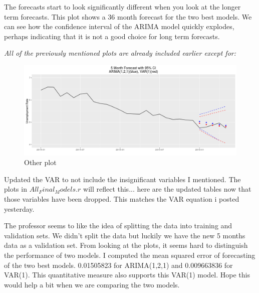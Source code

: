 \documentclass[twoside,twocolumn]{article}
\begin{document}
The forecasts start to look significantly different when you look at the longer term forecasts. This plot shows a 36 month forecast for the two best models. We can see how the confidence interval of the ARIMA model quickly explodes, perhaps indicating that it is not a good choice for long term forecasts.

\textit{All of the previously mentioned plots are already included earlier except for:}
    \begin{figure}[htb]
    	\centering
     	\caption{Other plot}
     	\includegraphics[width=\linewidth]{images/arimavarforcastalso}
 \end{figure}
 


Updated the VAR to not include the insignificant variables I mentioned. The plots in \(All_Final_Models.r\) will reflect this... here are the updated tables now that those variables have been dropped. This matches the VAR equation i posted yesterday.


The professor seems to like the idea of splitting the data into training and validation sets. We didn't split the data but luckily we have the new 5 months data as a validation set. From looking at the plots, it seems hard to distinguish the performance of two models. I computed the mean squared error of forecasting of the two best models. 0.01505823 for ARIMA(1,2,1) and 0.009663836 for VAR(1). This quantitative measure also supports this VAR(1) model. Hope this would help a bit when we are comparing the two models. 
 


\begin{flushleft}
\end{flushleft}
 
\end{document}

